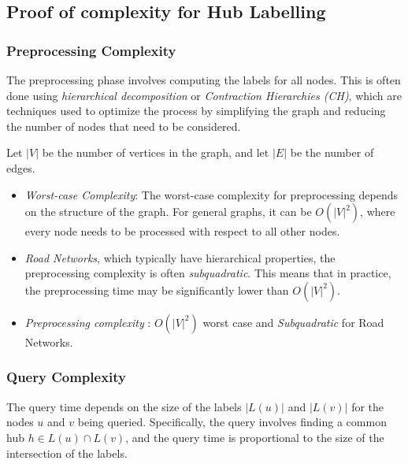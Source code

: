 \begin{appendices}
\section{Proof of complexity for Hub Labelling}\label{appendix:Hub Labelling:Complexity}

	\subsubsection{Preprocessing Complexity}
	
	The preprocessing phase involves computing the labels for all nodes. This is often done using \textit{hierarchical decomposition} or \textit{Contraction Hierarchies (CH)}, which are techniques used to optimize the process by simplifying the graph and reducing the number of nodes that need to be considered.
	
	
	Let $ |V| $ be the number of vertices in the graph, and let $|E| $ be the number of edges.
	
	\begin{itemize}

	\item \textit{Worst-case Complexity}: 
	The worst-case complexity for preprocessing depends on the structure of the graph. For general graphs, it can be $ O(|V|^2) $, where every node needs to be processed with respect to all other nodes. 
	
	\item \textit{Road Networks}, which typically have hierarchical properties, the preprocessing complexity is often \textit{subquadratic}. This means that in practice, the preprocessing time may be significantly lower than $ O(|V|^2) $.
	
	\item \textit{Preprocessing complexity} : $ O(|V|^2) $ worst case and \textit{Subquadratic} for Road Networks.
	
		\end{itemize}
	\subsubsection{Query Complexity}
	
	The query time depends on the size of the labels $ |L(u)| $ and $|L(v)| $ for the nodes $ u $ and $ v $ being queried. Specifically, the query involves finding a common hub $ h \in L(u) \cap L(v) $, and the query time is proportional to the size of the intersection of the labels. 
	
	\begin{itemize}
	

\end{itemize}
\end{appendices}
